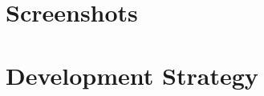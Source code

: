 \documentclass{mproj}
\begin{document}
\chapter{Screenshots}





\chapter{Development Strategy}





\end{document}
